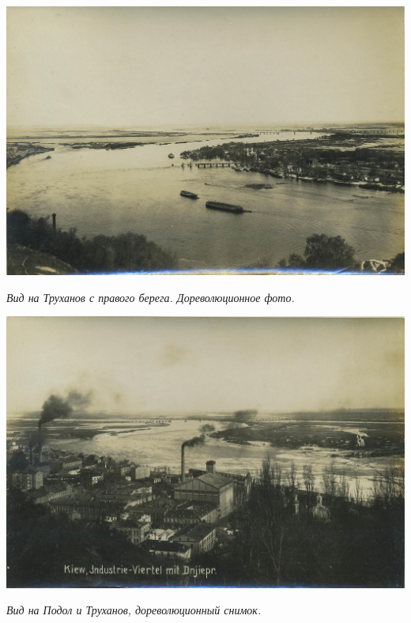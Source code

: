 \begin{center}
\includegraphics[width=\linewidth]{chast-gorodki/cherto/truhanov-s-gory.jpg}

\textit{Вид на Труханов с правого берега. Дореволюционное фото.}
\end{center}


\begin{center}
\includegraphics[width=\linewidth]{chast-gorodki/cherto/tru-19x2.jpg}

\textit{Вид на Подол и Труханов, дореволюционный снимок.}
\end{center}
\vspace*{\fill}
\newpage




